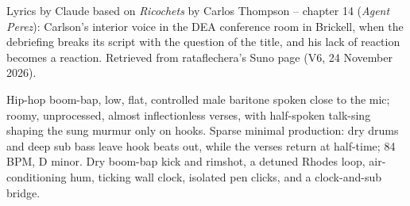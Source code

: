 
\begin{notes}
Lyrics by Claude based on \emph{Ricochets} by Carlos Thompson -- chapter 14 (\emph{Agent Perez}): Carlson's interior voice in the DEA conference room in Brickell, when the debriefing breaks its script with the question of the title, and his lack of reaction becomes a reaction. Retrieved from rataflechera's Suno page (V6, 24 November 2026).
\end{notes}
\begin{style}
Hip-hop boom-bap, low, flat, controlled male baritone spoken close to the mic; roomy, unprocessed, almost inflectionless verses, with half-spoken talk-sing shaping the sung murmur only on hooks. Sparse minimal production: dry drums and deep sub bass leave hook beats out, while the verses return at half-time; 84 BPM, D minor. Dry boom-bap kick and rimshot, a detuned Rhodes loop, air-conditioning hum, ticking wall clock, isolated pen clicks, and a clock-and-sub bridge.
\end{style}
